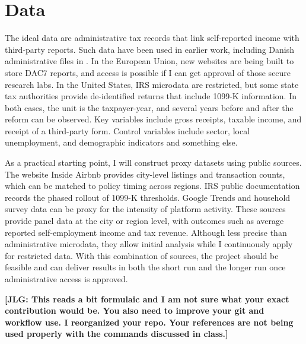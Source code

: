 \documentclass[11pt]{article}
\begin{document}
\section*{Data}
The ideal data are administrative tax records that link self-reported income with third-party reports. Such data have been used in earlier work, including Danish administrative files in \citet{kleven2011unwilling}. In the European Union, new websites are being built to store DAC7 reports, and access is possible if I can get approval of those secure research labs. In the United States, IRS microdata are restricted, but some state tax authorities provide de-identified returns that include 1099-K information. In both cases, the unit is the taxpayer-year, and several years before and after the reform can be observed. Key variables include gross receipts, taxable income, and receipt of a third-party form. Control variables include sector, local unemployment, and demographic indicators and something else.

As a practical starting point, I will construct proxy datasets using public sources. The website Inside Airbnb provides city-level listings and transaction counts, which can be matched to policy timing across regions. IRS public documentation records the phased rollout of 1099-K thresholds. Google Trends and household survey data can be proxy for the intensity of platform activity. These sources provide panel data at the city or region level, with outcomes such as average reported self-employment income and tax revenue. Although less precise than administrative microdata, they allow initial analysis while I continuously apply for restricted data. With this combination of sources, the project should be feasible and can deliver results in both the short run and the longer run once administrative access is approved.

\bigskip 

\noindent \textbf{[JLG: This reads a bit formulaic and I am not sure what your exact contribution would be. You also need to improve your git and workflow use. I reorganized your repo. Your references are not being used properly with the commands discussed in class.]}

\newpage


\end{document}
